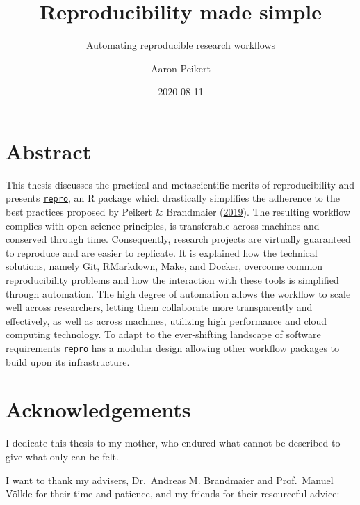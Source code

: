 \documentclass[12pt,a4paper,twoside]{article}
\title{Reproducibility made simple}
\subtitle{Automating reproducible research workflows}
\author{Aaron Peikert}
\date{2020-08-11}
\begin{document}
\maketitle

{
\setcounter{tocdepth}{2}
\tableofcontents
}
\newpage\null\thispagestyle{empty}\newpage

\hypertarget{abstract}{%
\section*{Abstract}\label{abstract}}

This thesis discusses the practical and metascientific merits of reproducibility and presents \href{https://github.com/aaronpeikert/repro}{\texttt{repro}}, an R package which drastically simplifies the adherence to the best practices proposed by Peikert \& Brandmaier (\protect\hyperlink{ref-peikertReproducibleDataAnalysis2019}{2019}).
The resulting workflow complies with open science principles, is transferable across machines and conserved through time.
Consequently, research projects are virtually guaranteed to reproduce and are easier to replicate.
It is explained how the technical solutions, namely Git, RMarkdown, Make, and Docker, overcome common reproducibility problems and how the interaction with these tools is simplified through automation.
The high degree of automation allows the workflow to scale well across researchers, letting them collaborate more transparently and effectively, as well as across machines, utilizing high performance and cloud computing technology.
To adapt to the ever-shifting landscape of software requirements \href{https://github.com/aaronpeikert/repro}{\texttt{repro}} has a modular design allowing other workflow packages to build upon its infrastructure.

\hypertarget{acknowledgements}{%
\section*{Acknowledgements}\label{acknowledgements}}

I dedicate this thesis to my mother, who endured what cannot be described to give what only can be felt.

I want to thank my advisers, Dr.~Andreas M. Brandmaier and Prof.~Manuel Völkle for their time and patience, and my friends for their resourceful advice:
\end{document}
